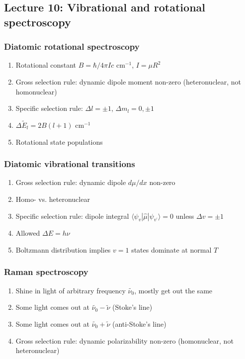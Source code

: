 \documentclass[11pt]{article}
\begin{document}
\subsection{Lecture 10: Vibrational and rotational spectroscopy}
\label{sec:org99cb81c}
\subsubsection{Diatomic rotational spectroscopy}
\label{sec:org8292cca}
\begin{enumerate}
\item Rotational constant \(B = \hbar/4\pi I c\) cm\(^{-1}\), \(I=\mu R^2\)
\item Gross selection rule: dynamic dipole moment non-zero (heteronuclear, not homonuclear)
\item Specific selection rule: \(\Delta l=\pm 1\), \(\Delta m_l=0, \pm1\)
\item \(\Delta \tilde E_l  = 2B(l+1)\) cm\(^{-1}\)
\item Rotational state populations
\end{enumerate}
\subsubsection{Diatomic vibrational transitions}
\label{sec:org8694172}
\begin{enumerate}
\item Gross selection rule: dynamic dipole \(d\mu/dx\) non-zero
\item Homo- vs. heteronuclear
\item Specific selection rule: dipole integral \(\langle \psi_v|\hat\mu|\psi_{v^\prime} \rangle =0\)
unless \(\Delta v = \pm 1\)
\item Allowed \(\Delta E = h\nu\)
\item Boltzmann distribution implies \(v=1\) states dominate at normal \(T\)
\end{enumerate}
\subsubsection{Raman spectroscopy}
\label{sec:orgaafd86c}
\begin{enumerate}
\item Shine in light of arbitrary frequency \(\tilde{\nu_0}\), mostly get out the same
\item Some light comes out at \(\tilde{\nu_0}-\tilde{\nu}\) (Stoke's line)
\item Some light comes out at \(\tilde{\nu_0}+\tilde{\nu}\) (anti-Stoke's line)
\item Gross selection rule: dynamic polarizability non-zero (homonuclear, not heteronuclear)
\end{enumerate}
\end{document}
